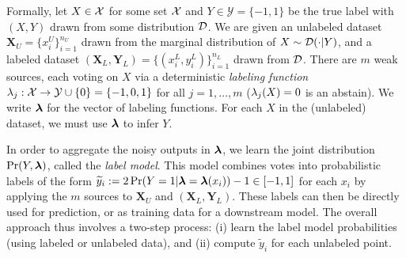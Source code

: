 Formally, let $X \in \mathcal{X}$ for some set $\mathcal{X}$ and $Y \in \mathcal{Y} = \{-1, 1\}$ be the true label with $(X, Y)$ drawn from some distribution $\mathcal{D}$. We are given an unlabeled dataset $\bm{X}_U = \{x_i^U\}_{i = 1}^{n_U}$ drawn from the marginal distribution of $X \sim \mathcal{D}(\cdot | Y)$, and a labeled dataset $(\bm{X}_L, \bm{Y}_L) = \{(x_i^L, y_i^L) \}_{i = 1}^{n_L}$ drawn from $\mathcal{D}$.
There are $m$ weak sources, each
voting on $X$ via a deterministic \textit{labeling function}
$\lambda_j: \mathcal{X} \rightarrow \mathcal{Y} \cup \{0\} = \{-1, 0, 1\}$ for all
$j = 1, \dots, m$ ($\lambda_j(X) = 0$ is an abstain). 
We write $\bm{\lambda}$ for the vector of labeling functions. For each $X$ in the (unlabeled) dataset, we must use $\bm{\lambda}$ to infer $Y$.

In order to aggregate the noisy outputs in $\bm{\lambda}$, we learn the joint distribution $\Pr(Y, \bm{\lambda})$, called the \textit{label model}. This model combines votes into probabilistic labels of the form $\widetilde{y}_i := 2 \Pr(Y = 1 | \bm{\lambda} = \bm{\lambda}(x_i)) - 1 \in [-1, 1]$ for each $x_i$ by applying
the $m$ sources to $\bm{X}_U$ and $(\bm{X}_L, \bm{Y}_L)$. These labels can then be directly used for prediction, or as training data for a downstream model. The overall approach thus involves a two-step process: (i) learn the label model probabilities (using labeled or unlabeled data), and (ii) compute $\tilde{y}_i$ for each unlabeled point.



